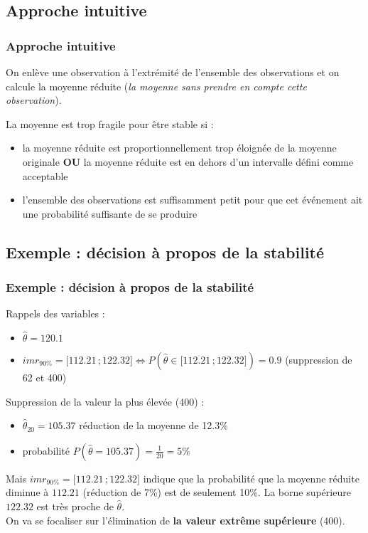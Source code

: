 \documentclass[handout]{beamer}
\newcommand{\intervalleff}[2]{\mathopen{[}#1\,;#2\mathclose{]}}
\begin{document}
		\subsection{Approche intuitive}
		\begin{frame}
			\frametitle{Approche intuitive}
			On enlève une observation à l'extrémité de l'ensemble des observations et on calcule la moyenne réduite (\textit{la moyenne sans prendre en compte cette observation}).

			\vspace{15px}
			La moyenne est trop fragile pour être stable si :
			\begin{itemize}
				\item la moyenne réduite est proportionnellement trop éloignée de la moyenne originale \textbf{OU} la moyenne réduite est en dehors d'un intervalle défini comme acceptable
				\item l'ensemble des observations est suffisamment petit pour que cet événement ait une probabilité suffisante de se produire
			\end{itemize}
		\end{frame}


		\subsection{Exemple : décision à propos de la stabilité}
		\begin{frame}
			\frametitle{Exemple : décision à propos de la stabilité}
			Rappels des variables :
			\begin{itemize}
				\item $\hat{\theta} = 120.1 $
				\item $imr_{90 \%} = \intervalleff{112.21}{122.32} \Leftrightarrow P(\hat{\theta} \in \intervalleff{112.21}{122.32}) = 0.9$ (suppression de 62 et 400)
			\end{itemize}

			\vspace{10px}
			Suppression de la valeur la plus élevée (400) :
			\begin{itemize}
				\item $\hat{\theta}_{20} = 105.37 $ réduction de la moyenne de 12.3\%
				\item probabilité $P(\hat{\theta} = 105.37) = \frac{1}{20} = 5 \%$
			\end{itemize}

			\vspace{10px}
			Mais $imr_{90 \%} = \intervalleff{112.21}{122.32}$ indique que la probabilité que la moyenne réduite diminue à $112.21$ (réduction de 7\%) est de seulement 10\%. La borne supérieure $122.32$ est très proche de $\hat{\theta}$.\\

			\vspace{10px}
			On va se focaliser sur l'élimination de \textbf{la valeur extrême supérieure} (400).
		\end{frame}
\end{document}
